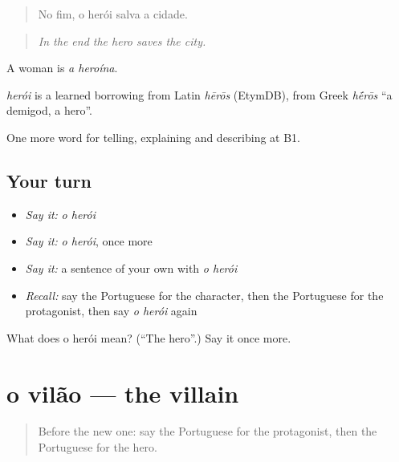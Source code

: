 \begin{quote}
No fim, o herói salva a cidade.
\end{quote}

\begin{quote}
\emph{In the end the hero saves the city.}
\end{quote}

A woman is \emph{a heroína}.

\begin{cousinweb}
\emph{herói} is a learned borrowing from Latin \emph{hērōs} (EtymDB), from Greek \emph{h\'{\={e}}rōs} \textquotedblleft{}a demigod, a hero\textquotedblright{}.
\end{cousinweb}

\begin{grammarlens}[title={What you've built}]
One more word for telling, explaining and describing at B1.
\end{grammarlens}

\subsection*{Your turn}
\begin{itemize}
\raggedright
  \item \emph{Say it:} \emph{o herói}
  \item \emph{Say it:} \emph{o herói}, once more
  \item \emph{Say it:} a sentence of your own with \emph{o herói}
  \item \emph{Recall:} say the Portuguese for the character, then the Portuguese for the protagonist, then say \emph{o herói} again
\end{itemize}

\begin{tcolorbox}[breakable,colback=teal!4,colframe=teal!35!black,title={Before you move on}]
What does o herói mean? (\textquotedblleft{}The hero\textquotedblright{}.) Say it once more.
\end{tcolorbox}
\section[o vilão]{o vilão — the villain}

\label{lesson:PT-C325-vilao}



\begin{quote}
Before the new one: say the Portuguese for the protagonist, then the Portuguese for the hero.
\end{quote}

